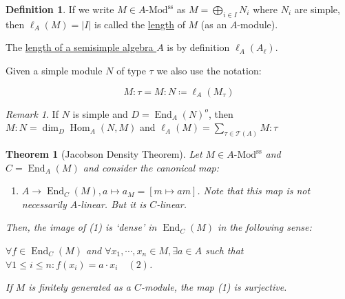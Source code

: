 \documentclass{article}
\theoremstyle{definition}
\newtheorem*{definition}{Definition}
\theoremstyle{plain}
\newtheorem{theorem}{Theorem}[section]
\theoremstyle{remark}
\newtheorem*{remark*}{Remark}
\begin{document}
    \begin{definition}
        If we write \(M\in A\text{-Mod}^{\text{ss}}\) as \(M = \bigoplus_{i \in I} N_i\) where \(N_i\) are simple, then \(\ell_A(M) = \vert I \vert \) is called the \underline{length} of \(M\) (as an \(A\)-module).
        
        The \underline{length of a semisimple algebra \(A\)} is by definition \(\ell_A(A_\ell)\).

        Given a simple module \(N\) of type \(\tau\) we also use the notation:

        \[
            M : \tau = M : N \coloneqq \ell_A(M_{\tau})
        \]
    \end{definition}

    \begin{remark*}
        If \(N\) is simple and \(D = \operatorname{End}_A(N)^o\), then \(M : N = \dim_D \operatorname{Hom}_A(N,M)\) and \(\ell_A(M) = \sum_{\tau \in \mathcal{T} (A)} M : \tau\) 
    \end{remark*}

    \begin{theorem}
        [Jacobson Density Theorem]

        Let \(M\in A\text{-Mod}^{\text{ss}}\) and \(C = \operatorname{End}_A(M)\) and consider the canonical map:

        \begin{enumerate}[label=(\arabic*)]
            \item \(A \to \operatorname{End}_C(M), a \mapsto a_M = [m \mapsto am]\). Note that this map is not necessarily \(A\)-linear. But it is \(C\)-linear.
        \end{enumerate} 

        Then, the image of (1) is `dense' in \(\operatorname{End}_C(M)\) in the following sense:

        \(\forall f\in \operatorname{End}_C(M)\) and \(\forall x_1 , \cdots , x_n \in M, \exists a \in A\) such that \(\forall 1 \leq i \leq n : f(x_i) = a \cdot x_i \quad (2)\).

        If \(M\) is finitely generated as a \(C\)-module, the map (1) is surjective.
    \end{theorem}
\end{document}
